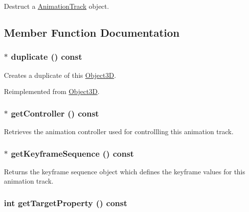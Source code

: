 Destruct a \hyperlink{classm3g_1_1AnimationTrack}{AnimationTrack} object. 

\subsection{Member Function Documentation}
\hypertarget{classm3g_1_1AnimationTrack_e19aae30ee68ef05afd74ec9c19cf7d1}{
\subsubsection[{duplicate}]{ $\ast$ duplicate () const}}
\label{classm3g_1_1AnimationTrack_e19aae30ee68ef05afd74ec9c19cf7d1}


Creates a duplicate of this \hyperlink{classm3g_1_1Object3D}{Object3D}. 

Reimplemented from \hyperlink{classm3g_1_1Object3D_a25110dac934f867b83b73ad4741a0f4}{Object3D}.\hypertarget{classm3g_1_1AnimationTrack_3a54e89528127de5b4d0a48a2045a91c}{
\subsubsection[{getController}]{ $\ast$ getController () const}}
\label{classm3g_1_1AnimationTrack_3a54e89528127de5b4d0a48a2045a91c}


Retrieves the animation controller used for controllling this animation track. \hypertarget{classm3g_1_1AnimationTrack_e83c81771a8329e1e5f978f228c0b308}{
\subsubsection[{getKeyframeSequence}]{ $\ast$ getKeyframeSequence () const}}
\label{classm3g_1_1AnimationTrack_e83c81771a8329e1e5f978f228c0b308}


Returns the keyframe sequence object which defines the keyframe values for this animation track. \hypertarget{classm3g_1_1AnimationTrack_143de0bf90b434f1487caae5b0b66bbf}{
\subsubsection[{getTargetProperty}]{\setlength{\rightskip}{0pt plus 5cm}int getTargetProperty () const}}
\label{classm3g_1_1AnimationTrack_143de0bf90b434f1487caae5b0b66bbf}


